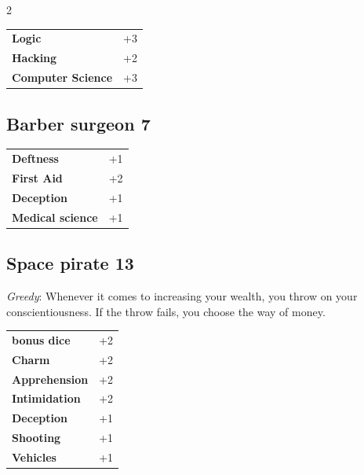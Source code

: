 \begin{multicols}{2}
\begin{tcolorbox}
\vspace{3mm}

\begin{tabular}{@{}ll@{}}
    \textbf{Logic} & +3\\
    \textbf{Hacking} & +2\\
    \textbf{Computer Science} & +3\\
\end{tabular}


\end{tcolorbox}

\begin{tcolorbox}
    \subsection*{Barber surgeon \hfill \small{7 }}
    \tcblower




\begin{tabular}{@{}ll@{}}
    \textbf{Deftness} & +1\\
    \textbf{First Aid} & +2\\
    \textbf{Deception} & +1\\
    \textbf{Medical science} & +1\\
\end{tabular}


\end{tcolorbox}

\begin{tcolorbox}
    \subsection*{Space pirate \hfill \small{13 }}
    \tcblower
\textit{Greedy}: Whenever it comes to increasing your wealth, you throw on your conscientiousness. If the throw fails, you choose the way of money.


\vspace{3mm}

\begin{tabular}{@{}ll@{}}
    \textbf{bonus dice} & +2\\
    \textbf{Charm} & +2\\
    \textbf{Apprehension} & +2\\
    \textbf{Intimidation} & +2\\
    \textbf{Deception} & +1\\
    \textbf{Shooting} & +1\\
    \textbf{Vehicles} & +1\\
\end{tabular}


\end{tcolorbox}
\end{multicols}
